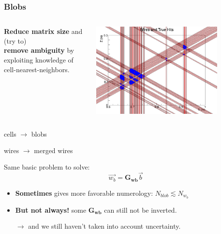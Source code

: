 \begin{frame}
  \frametitle{Blobs}

  \begin{columns}
    \begin{column}{0.6\textwidth}
      \textbf{Reduce matrix size} and (try to) \\
      \textbf{remove ambiguity} by exploiting knowledge
      of cell-nearest-neighbors.
    \end{column}
    \begin{column}{0.4\textwidth}
      \includegraphics[width=0.8\textwidth]{wires-and-true-hits.png}          
    \end{column}
  \end{columns}

  \begin{center}
    cells $\to$ blobs

    wires $\to$ merged wires
  \end{center}

  Same basic problem to solve:
  \[\vec{w_b} = \mathbf{G_{wb}} \vec{b}\]

  \begin{itemize}
  \item \textbf{Sometimes} gives more favorable numerology: $N_{blob} \lesssim N_{w_b}$
  \item \textbf{But not always!} some $\mathbf{G_{wb}}$ can still not be inverted.
  \item[$\rightarrow$] and we still haven't taken into account uncertainty.
  \end{itemize}
\end{frame}

